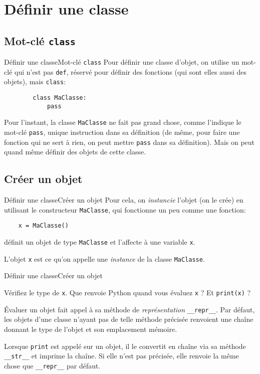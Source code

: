 \section{Définir une classe}

\subsection{Mot-clé \texttt{class}}

\begin{frame}[fragile]{Définir une classe}{Mot-clé \lstinline|class|}
	Pour définir une classe d'objet, on utilise un mot-clé qui n'est pas \lstinline|def|, réservé pour définir des fonctions (qui sont elles aussi des objets), mais \lstinline|class|:\pause
	\begin{lstlisting}
		class MaClasse:
			pass
	\end{lstlisting}\pause
	Pour l'instant, la classe \lstinline|MaClasse| ne fait pas grand chose, comme l'indique le mot-clé \lstinline|pass|, unique instruction dans sa définition (de même, pour faire une fonction qui ne sert à rien, on peut mettre \lstinline|pass| dans sa définition). Mais on peut quand même définir des objets de cette classe.
\end{frame}

\subsection{Créer un objet}

\begin{frame}[fragile]{Définir une classe}{Créer un objet}
	Pour cela, on \textit{instancie} l'objet (on le crée) en utilisant le constructeur \lstinline|MaClasse|, qui fonctionne un peu comme une fonction:
	\begin{lstlisting}
	x = MaClasse()
	\end{lstlisting}
	définit un objet de type \lstinline|MaClasse| et l'affecte à une variable \lstinline|x|.
	
	L'objet \lstinline|x| est ce qu'on appelle une \textit{instance} de la classe \lstinline|MaClasse|.
\end{frame}

\begin{frame}[fragile]{Définir une classe}{Créer un objet}
	\begin{exem}
		Vérifiez le type de \lstinline|x|. Que renvoie Python quand vous évaluez \lstinline|x| ? Et \lstinline|print(x)| ?
	\end{exem}
	\pause
	
	Évaluer un objet fait appel à sa méthode de \textit{représentation} \lstinline|__repr__|. Par défaut, les objets d'une classe n'ayant pas de telle méthode précisée renvoient une chaîne donnant le type de l'objet et son emplacement mémoire.\pause
	
	Lorsque \lstinline|print| est appelé sur un objet, il le convertit en chaîne via sa méthode \lstinline|__str__| et imprime la chaîne. Si elle n'est pas précisée, elle renvoie la même chose que \lstinline|__repr__| par défaut.
\end{frame}

